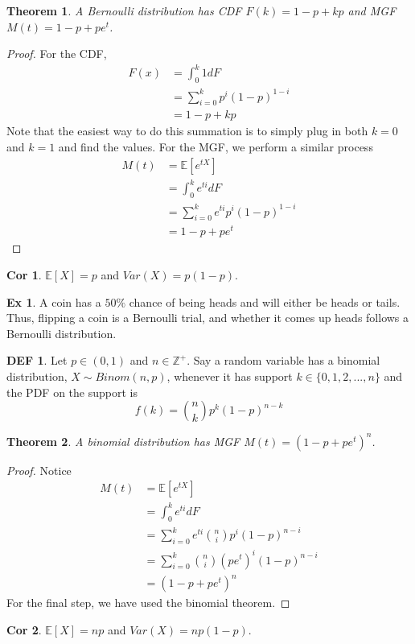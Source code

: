 \documentclass{article}
\newtheorem{theorem}{Theorem}
\theoremstyle{definition}\newtheorem{definition}{DEF}
\theoremstyle{definition}\newtheorem{example}{Ex}
\theoremstyle{lemma}\newtheorem{lemma}{Lemma}
\theoremstyle{corrolary}\newtheorem{corrolary}{Cor}
\begin{document}
\begin{theorem}
A Bernoulli distribution has CDF $F(k)=1-p+kp$ and MGF $M(t)=1-p+pe^t$.
\end{theorem}
\begin{proof}
For the CDF,
\begin{align*}
F(x)&=\int_0^k1dF\\
&=\sum_{i=0}^k p^i(1-p)^{1-i}\\
&=1-p+kp
\end{align*}
Note that the easiest way to do this summation is to simply plug in both $k=0$ and $k=1$ and find the values.
For the MGF, we perform a similar process
\begin{align*}
M(t)&=\mathbb{E}[e^{tX}]\\
&=\int_0^ke^{ti}dF\\
&=\sum_{i=0}^k e^{ti}p^i(1-p)^{1-i}\\
&=1-p+pe^t
\end{align*}
\end{proof}
\begin{corrolary}
$\mathbb{E}[X]=p$ and $Var(X)=p(1-p)$.
\end{corrolary}

\begin{example}
A coin has a $50\%$ chance of being heads and will either be heads or tails.
Thus, flipping a coin is a Bernoulli trial, and whether it comes up heads follows a Bernoulli distribution.
\end{example}

\begin{definition}
Let $p\in(0,1)$ and $n\in\mathbb{Z}^+$.
Say a random variable has a binomial distribution, $X\sim Binom(n,p)$, whenever it has support $k\in \{0, 1, 2, ..., n\}$ and the PDF on the support is
\begin{equation}
f(k)=\binom{n}{k} p^k (1-p)^{n-k}
\end{equation}
\end{definition}

\begin{theorem}
A binomial distribution has MGF $M(t)=\left( 1-p+pe^t\right)^n$.
\end{theorem}
\begin{proof}
Notice
\begin{align*}
M(t)&=\mathbb{E}[e^{tX}]\\
&=\int_0^k e^{ti}dF\\
&=\sum_{i=0}^k e^{ti}\binom{n}{i}p^i(1-p)^{n-i}\\
&=\sum_{i=0}^k \binom{n}{i}\left( pe^t\right)^i(1-p)^{n-i}\\
&=\left(1-p+pe^t\right)^n
\end{align*}
For the final step, we have used the binomial theorem.
\end{proof}
\begin{corrolary}
$\mathbb{E}[X]=np$ and $Var(X)=np(1-p)$.
\end{corrolary}
\end{document}
